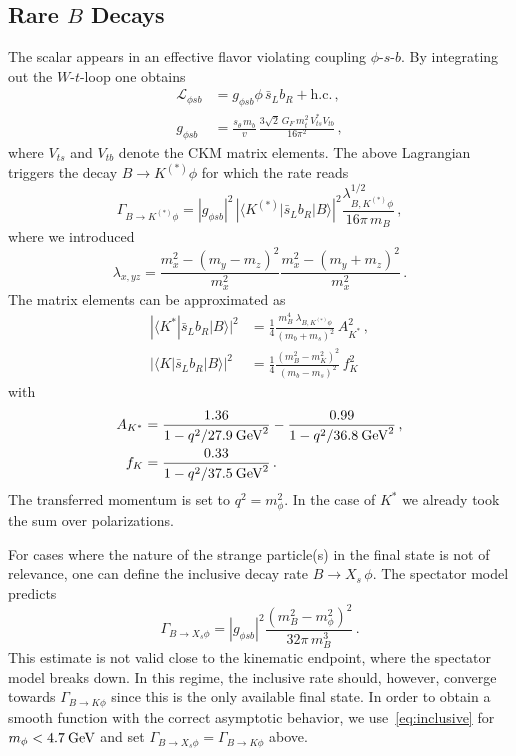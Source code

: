 \documentclass[preprintnumbers,twocolumn,aps,floats,nofootinbib]{revtex4-1}
\newcommand{\eVdist}{\kern-0.06em}
\newcommand{\gev}{\:\text{Ge\eVdist V}}
\begin{document}
\subsection{Rare $B$ Decays}
The scalar appears in an effective flavor violating coupling $\phi$-$s$-$b$. By integrating out the $W$-$t$-loop one obtains~\cite{Batell:2009jf}
\begin{align}
 \mathcal{L}_{\phi sb}&=g_{\phi sb} \phi\, \bar{s}_L b_R +\text{h.c.}\,,\nonumber\\
 g_{\phi sb}&=\frac{s_\theta\,m_b}{v}\,\frac{3\sqrt{2}\,  G_F \,m_t^2\, V_{ts}^* V_{tb}}{16\pi^2}\,,\label{eq:effcoupling}
\end{align}
where $V_{ts}$ and $ V_{tb}$ denote the CKM matrix elements. The above Lagrangian triggers the decay $B \rightarrow K^{(*)}\phi$ for which the rate reads
\begin{equation}
\label{eq:BKphi}
\Gamma_{B \rightarrow K^{(*)}\phi} =\left|g_{\phi sb}\right|^2\,\left|\langle K^{(*)}|\bar{s}_L b_R|B\rangle\right|^2 \frac{\lambda_{B, K^{(*)}\phi}^{1/2}}{16\pi\,m_B}\,,
\end{equation}
where we introduced
\begin{equation}
\lambda_{x,yz}=\frac{m_x^2-(m_y-m_z)^2}{m_x^2}\frac{m_x^2-(m_y+m_z)^2}{m_x^2}\,.
\end{equation}
The matrix elements can be approximated as~\cite{Ball:2004ye,Ball:2004rg}
\begin{align}
 |\langle K^*|\bar{s}_L b_R|B\rangle|^2&=\frac{1}{4}\frac{m_B^4\;\lambda_{B, K^{(*)}\phi}}{(m_b+m_s)^2}\,{A_{K^*}^2}\,,\nonumber\\
 |\langle K|\bar{s}_L b_R|B\rangle|^2 &=\frac{1}{4}\frac{(m_B^2-m_K^2)^2}{(m_b-m_s)^2}\,{f_{K}^2}\,
\end{align}
with
\begin{align} 
A_{K^*}&= \frac{1.36}{1-q^2/27.9\gev^2}-\frac{0.99}{1-q^2/36.8\gev^2}\,,\nonumber\\
f_{K}&= \frac{0.33}{1-q^2/37.5\gev^2}\,.
\end{align}
The transferred momentum is set to $q^2=m_\phi^2$. In the case of $K^*$ we already took the sum over polarizations.

For cases where the nature of the strange particle(s) in the final state is not of relevance, one can define the inclusive decay rate $B \rightarrow X_s\,\phi$. The spectator model predicts~\cite{Willey:1982mc}
\begin{equation}\label{eq:inclusive}
\Gamma_{B \rightarrow X_s\phi} =\left|g_{\phi sb}\right|^2\frac{(m_B^2-m_\phi^2)^2}{32\pi\,m_B^3}\,.
\end{equation}
This estimate is not valid close to the kinematic endpoint, where the spectator model breaks down. In this regime, the inclusive rate should, however, converge towards $\Gamma_{B \rightarrow K\phi}$ since this is the only available final state. In order to obtain a smooth function with the correct asymptotic behavior, we use~\eqref{eq:inclusive} for $m_\phi<4.7\gev$ and set $\Gamma_{B \rightarrow X_s\phi} =\Gamma_{B \rightarrow K\phi}$ above.
\end{document}
